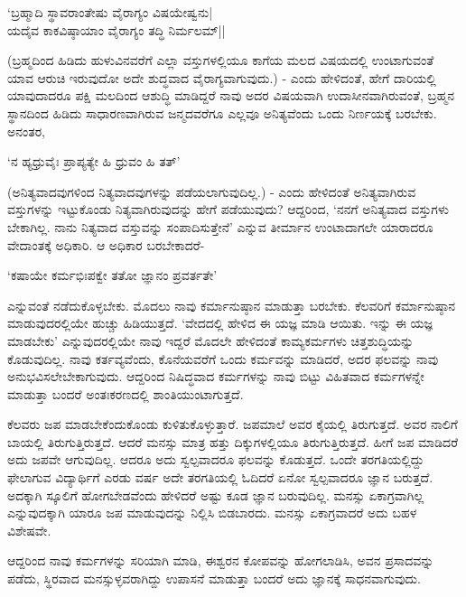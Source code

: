 \begin{shloka}
`ಬ್ರಹ್ಮಾದಿ ಸ್ಥಾವರಾಂತೇಷು ವೈರಾಗ್ಯಂ ವಿಷಯೇಷ್ವನು|\\
ಯದೈವ ಕಾಕವಿಷ್ಠಾಯಾಂ ವೈರಾಗ್ಯಂ ತದ್ಧಿ ನಿರ್ಮಲಮ್||
\end{shloka}

(ಬ್ರಹ್ಮದಿಂದ ಹಿಡಿದು ಹುಳುವಿನವರೆಗೆ ಎಲ್ಲಾ ವಸ್ತುಗಳಲ್ಲಿಯೂ ಕಾಗೆಯ ಮಲದ ವಿಷಯದಲ್ಲಿ ಉಂಟಾಗುವಂತೆ ಯಾವ ಆರುಚಿ ಇರುವುದೋ ಅದೇ ಶುದ್ಧವಾದ ವೈರಾಗ್ಯವಾಗುವುದು.) - ಎಂದು ಹೇಳಿದಂತೆ, ಹೇಗೆ ದಾರಿಯಲ್ಲಿ ಯಾವುದಾದರೂ ಪಕ್ಷಿ ಮಲದಿಂದ ಆಶುದ್ಧಿ ಮಾಡಿದ್ದರೆ ನಾವು ಅದರ ವಿಷಯವಾಗಿ ಉದಾಸೀನವಾಗಿರುವಂತೆ, ಬ್ರಹ್ಮನ ಸ್ಥಾನದಿಂದ ಹಿಡಿದು ಸಾಧಾರಣವಾಗಿರುವ ಜನ್ಮದವರೆಗೂ ಎಲ್ಲವೂ ಅನಿತ್ಯವೆಂದು ಒಂದು ನಿರ್ಣಯಕ್ಕೆ ಬರಬೇಕು. ಅನಂತರ,

\begin{shloka}
`ನ ಹ್ಯಧ್ರುವೈಃ ಪ್ರಾಪ್ಯತ್ಯೇ ಹಿ ಧ್ರುವಂ ಹಿ ತತ್'
\end{shloka}

(ಅನಿತ್ಯವಾದವುಗಳಿಂದ ನಿತ್ಯವಾದವುಗಳನ್ನು ಪಡೆಯಲಾಗುವುದಿಲ್ಲ.) - ಎಂದು ಹೇಳಿದಂತೆ ಅನಿತ್ಯವಾಗಿರುವ ವಸ್ತುಗಳನ್ನು ಇಟ್ಟುಕೊಂಡು ನಿತ್ಯವಾಗಿರುವುದನ್ನು ಹೇಗೆ ಪಡೆಯುವುದು? ಆದ್ದರಿಂದ, `ನನಗೆ ಅನಿತ್ಯವಾದ ವಸ್ತುಗಳು ಬೇಕಾಗಿಲ್ಲ. ನಾನು ನಿತ್ಯವಾದ ವಸ್ತುವನ್ನು ಸಂಪಾದಿಸುತ್ತೇನೆ' ಎನ್ನುವ ತೀರ್ಮಾನ ಉಂಟಾದಾಗಲೇ ಯಾರಾದರೂ ವೇದಾಂತಕ್ಕೆ ಅಧಿಕಾರಿ. ಆ ಅಧಿಕಾರ ಬರಬೇಕಾದರೆ-

\begin{shloka}
`ಕಷಾಯೇ ಕರ್ಮಭಿಃಪಕ್ವೇ ತತೋ ಜ್ಞಾನಂ ಪ್ರವರ್ತತೇ'
\end{shloka}

ಎನ್ನುವಂತೆ ನಡೆದುಕೊಳ್ಳಬೇಕು. ಮೊದಲು ನಾವು ಕರ್ಮಾನುಷ್ಠಾನ ಮಾಡುತ್ತಾ ಬರಬೇಕು. ಕೆಲವರಿಗೆ ಕರ್ಮಾನುಷ್ಠಾನ ಮಾಡುವುದರಲ್ಲಿಯೇ ಹುಚ್ಚು ಹಿಡಿಯುತ್ತದೆ. `ವೇದದಲ್ಲಿ ಹೇಳಿದ ಈ ಯಜ್ಞ ಮಾಡಿ ಆಯಿತು. ಇನ್ನು ಈ ಯಜ್ಞ ಮಾಡಬೇಕು' ಎನ್ನುವುದರಲ್ಲಿಯೇ ನಾವು ಇದ್ದರೆ ಮೊದಲೇ ಹೇಳಿದಂತೆ ಕಾಮ್ಯಕರ್ಮಗಳು ಚಿತ್ತಶುದ್ಧಿಯನ್ನು ಕೊಡುವುದಿಲ್ಲ. ನಾವು ಕರ್ತವ್ಯವೆಂದು, ಕೊನೆಯವರೆಗೆ ಒಂದು ಕರ್ಮವನ್ನು ಮಾಡಿದರೆ, ಅದರ ಫಲವನ್ನು ನಾವು ಅನುಭವಿಸಲೇಬೇಕಾಗುವುದು. ಆದ್ದರಿಂದ ನಿಷಿದ್ಧವಾದ ಕರ್ಮಗಳನ್ನು ನಾವು ಬಿಟ್ಟು ವಿಹಿತವಾದ ಕರ್ಮಗಳನ್ನೇ ಮಾಡುತ್ತಾ ಬಂದರೆ ಅಂತಃಕರಣದಲ್ಲಿ ಶಾಂತಿಯುಂಟಾಗುತ್ತದೆ.

ಕೆಲವರು ಜಪ ಮಾಡಬೇಕೆಂದುಕೊಂಡು ಕುಳಿತುಕೊಳ್ಳುತ್ತಾರೆ. ಜಪಮಾಲೆ ಅವರ ಕೈಯಲ್ಲಿ ತಿರುಗುತ್ತದೆ. ಅವರ ನಾಲಿಗೆ ಬಾಯಲ್ಲಿ ತಿರುಗುತ್ತಿರುತ್ತದೆ. ಆದರೆ ಮನಸ್ಸು ಮಾತ್ರ ಹತ್ತು ದಿಕ್ಕುಗಳಲ್ಲಿಯೂ ತಿರುಗುತ್ತಿರುತ್ತದೆ. ಹೀಗೆ ಜಪ ಮಾಡಿದರೆ ಅದು ಜಪವೇ ಆಗುವುದಿಲ್ಲ. ಆದರೂ ಅದು ಸ್ವಲ್ಪವಾದರೂ ಫಲವನ್ನು ಕೊಡುತ್ತದೆ. ಒಂದೇ ತರಗತಿಯಲ್ಲಿದ್ದು ಫೇಲಾಗುವ ವಿದ್ಯಾರ್ಥಿಗೆ ಎರಡು ವರ್ಷ ಅದೇ ತರಗತಿಯಲ್ಲಿ ಓದಿದರೆ ಏನೋ ಸ್ವಲ್ಪವಾದರೂ ಜ್ಞಾನ ಬರುತ್ತದೆ. ಅದಕ್ಕಾಗಿ ಸ್ಕೂಲಿಗೆ ಹೋಗಬೇಡವೆಂದು ಹೇಳಿದರೆ ಅಷ್ಟು ಕೂಡ ಜ್ಞಾನ ಬರುವುದಿಲ್ಲ. ಮನಸ್ಸು ಏಕಾಗ್ರವಾಗಿಲ್ಲ ಎನ್ನುವುದಕ್ಕಾಗಿ ಯಾರೂ ಜಪ ಮಾಡುವುದನ್ನು ನಿಲ್ಲಿಸಿ ಬಿಡಬಾರದು. ಮನಸ್ಸು ಏಕಾಗ್ರವಾದರೆ ಅದು ಬಹಳ ವಿಶೇಷವೇ.

ಆದ್ದರಿಂದ ನಾವು ಕರ್ಮಗಳನ್ನು ಸರಿಯಾಗಿ ಮಾಡಿ, ಈಶ್ವರನ ಕೋಪವನ್ನು ಹೋಗಲಾಡಿಸಿ, ಅವನ ಪ್ರಸಾದವನ್ನು ಪಡೆದು, ಸ್ಥಿರವಾದ ಮನಸ್ಸುಳ್ಳವರಾಗಿದ್ದು ಉಪಾಸನೆ ಮಾಡುತ್ತಾ ಬಂದರೆ ಅದು ಜ್ಞಾನಕ್ಕೆ ಸಾಧನವಾಗುವುದು.
